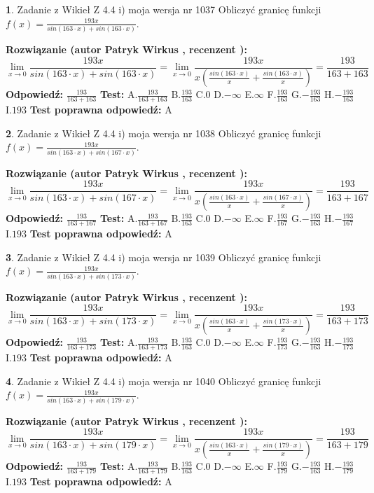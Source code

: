 \documentclass[12pt, a4paper]{article}
\theoremstyle{definition} %
\newtheorem{zad}{}
\newcommand{\zadStart}[1]{\begin{zad}#1\newline}
\newcommand{\zadStop}{\end{zad}}
\newcommand{\rozwStart}[2]{\noindent \textbf{Rozwiązanie (autor #1 , recenzent #2): }\newline}
\newcommand{\rozwStop}{\newline}
\newcommand{\odpStart}{\noindent \textbf{Odpowiedź:}\newline}
\newcommand{\odpStop}{\newline}
\newcommand{\testStart}{\noindent \textbf{Test:}\newline}
\newcommand{\testStop}{\newline}
\newcommand{\kluczStart}{\noindent \textbf{Test poprawna odpowiedź:}\newline}
\newcommand{\kluczStop}{\newline}
\begin{document}
\zadStart{Zadanie z Wikieł Z 4.4 i) moja wersja nr 1037}
Obliczyć granicę funkcji $f(x)=\frac{193x}{sin(163\cdot x) +sin(163\cdot x)}$.
\zadStop
\rozwStart{Patryk Wirkus}{}
$$\lim\limits_{x\to 0}\frac{193x}{sin(163\cdot x) +sin(163\cdot x)}=\lim\limits_{x\to 0}\frac{193x}{x(\frac{sin(163\cdot x)}{x}+\frac{sin(163\cdot x)}{x})}=\frac{193}{163+163}$$
\rozwStop
\odpStart
$\frac{193}{163+163}$
\odpStop
\testStart
A.$\frac{193}{163+163}$
B.$\frac{193}{163}$
C.$0$
D.$-\infty$
E.$\infty$
F.$\frac{193}{163}$
G.$-\frac{193}{163}$
H.$-\frac{193}{163}$
I.$193$
\testStop
\kluczStart
A
\kluczStop



\zadStart{Zadanie z Wikieł Z 4.4 i) moja wersja nr 1038}
Obliczyć granicę funkcji $f(x)=\frac{193x}{sin(163\cdot x) +sin(167\cdot x)}$.
\zadStop
\rozwStart{Patryk Wirkus}{}
$$\lim\limits_{x\to 0}\frac{193x}{sin(163\cdot x) +sin(167\cdot x)}=\lim\limits_{x\to 0}\frac{193x}{x(\frac{sin(163\cdot x)}{x}+\frac{sin(167\cdot x)}{x})}=\frac{193}{163+167}$$
\rozwStop
\odpStart
$\frac{193}{163+167}$
\odpStop
\testStart
A.$\frac{193}{163+167}$
B.$\frac{193}{163}$
C.$0$
D.$-\infty$
E.$\infty$
F.$\frac{193}{167}$
G.$-\frac{193}{163}$
H.$-\frac{193}{167}$
I.$193$
\testStop
\kluczStart
A
\kluczStop



\zadStart{Zadanie z Wikieł Z 4.4 i) moja wersja nr 1039}
Obliczyć granicę funkcji $f(x)=\frac{193x}{sin(163\cdot x) +sin(173\cdot x)}$.
\zadStop
\rozwStart{Patryk Wirkus}{}
$$\lim\limits_{x\to 0}\frac{193x}{sin(163\cdot x) +sin(173\cdot x)}=\lim\limits_{x\to 0}\frac{193x}{x(\frac{sin(163\cdot x)}{x}+\frac{sin(173\cdot x)}{x})}=\frac{193}{163+173}$$
\rozwStop
\odpStart
$\frac{193}{163+173}$
\odpStop
\testStart
A.$\frac{193}{163+173}$
B.$\frac{193}{163}$
C.$0$
D.$-\infty$
E.$\infty$
F.$\frac{193}{173}$
G.$-\frac{193}{163}$
H.$-\frac{193}{173}$
I.$193$
\testStop
\kluczStart
A
\kluczStop



\zadStart{Zadanie z Wikieł Z 4.4 i) moja wersja nr 1040}
Obliczyć granicę funkcji $f(x)=\frac{193x}{sin(163\cdot x) +sin(179\cdot x)}$.
\zadStop
\rozwStart{Patryk Wirkus}{}
$$\lim\limits_{x\to 0}\frac{193x}{sin(163\cdot x) +sin(179\cdot x)}=\lim\limits_{x\to 0}\frac{193x}{x(\frac{sin(163\cdot x)}{x}+\frac{sin(179\cdot x)}{x})}=\frac{193}{163+179}$$
\rozwStop
\odpStart
$\frac{193}{163+179}$
\odpStop
\testStart
A.$\frac{193}{163+179}$
B.$\frac{193}{163}$
C.$0$
D.$-\infty$
E.$\infty$
F.$\frac{193}{179}$
G.$-\frac{193}{163}$
H.$-\frac{193}{179}$
I.$193$
\testStop
\kluczStart
A
\kluczStop
\end{document}
